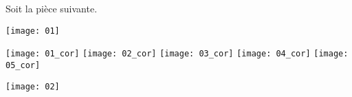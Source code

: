 \normaltrue \difficilefalse \tdifficilefalse
\correctionfalse


\setcounter{question}{0}%

\ifcorrection
\else
{}
\fi


\ifprof 
\else
Soit la pièce suivante.
\begin{center}
\texttt{[image: 01]}
\end{center}
 \fi
 
\ifprof
\begin{marginfigure}
\texttt{[image: 01\_cor]}
\texttt{[image: 02\_cor]}
\texttt{[image: 03\_cor]}
\texttt{[image: 04\_cor]}
\texttt{[image: 05\_cor]}
\end{marginfigure}
\else 
\begin{marginfigure}
\texttt{[image: 02]}
\end{marginfigure}
\fi

\ifprof
\else


\fi